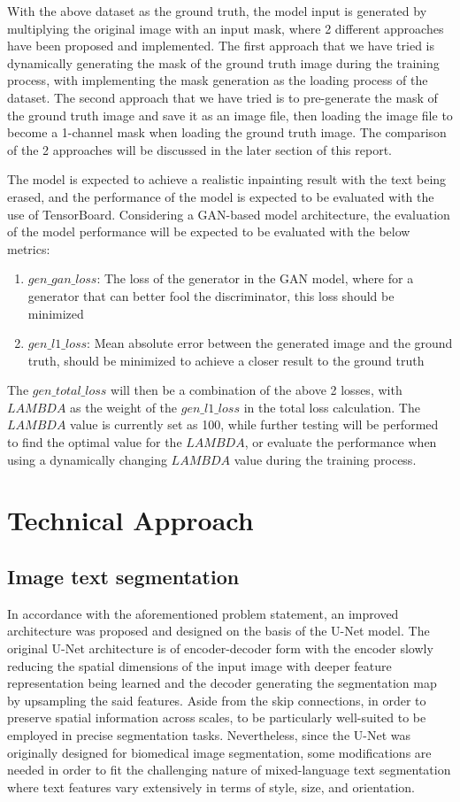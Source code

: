 \documentclass[10pt,twocolumn,letterpaper]{article}
\begin{document}
With the above dataset as the ground truth, the model input is generated by multiplying the original image with an input mask, where 2 different approaches have been 
proposed and implemented. The first approach that we have tried is dynamically generating the mask of the ground truth image during the training process, with implementing
the mask generation as the loading process of the dataset. The second approach that we have tried is to pre-generate the mask of the ground truth image and save it as an image
file, then loading the image file to become a 1-channel mask when loading the ground truth image. The comparison of the 2 approaches will be discussed in the later 
section of this report.

The model is expected to achieve a realistic inpainting result with the text being erased, and the performance of the model is expected to be evaluated with the
use of TensorBoard. Considering a GAN-based model architecture, the evaluation of the model performance will be expected to be evaluated with the below metrics:
\begin{enumerate}
    \item $gen\_gan\_loss$: The loss of the generator in the GAN model, where for a generator that can better fool the discriminator, this loss should be minimized
    \item $gen\_l1\_loss$: Mean absolute error between the generated image and the ground truth, should be minimized to achieve a closer result to the ground truth
\end{enumerate}

The $gen\_total\_loss$ will then be a combination of the above 2 losses, with $LAMBDA$ as the weight of the $gen\_l1\_loss$ in the total loss calculation. The $LAMBDA$
value is currently set as 100, while further testing will be performed to find the optimal value for the $LAMBDA$, or evaluate the performance when using a dynamically
changing $LAMBDA$ value during the training process.

\section{Technical Approach}

\subsection{Image text segmentation}
In accordance with the aforementioned problem statement, an improved architecture was proposed and designed on the basis of the U-Net model. 
The original U-Net architecture is of encoder-decoder form with the encoder slowly reducing the spatial dimensions of the input image with 
deeper feature representation being learned and the decoder generating the segmentation map by upsampling the said features. 
Aside from the skip connections, in order to preserve spatial information across scales, to be particularly well-suited to be employed 
in precise segmentation tasks. Nevertheless, since the U-Net was originally designed for biomedical image segmentation, 
some modifications are needed in order to fit the challenging nature of mixed-language text segmentation where text features 
vary extensively in terms of style, size, and orientation.
\end{document}
